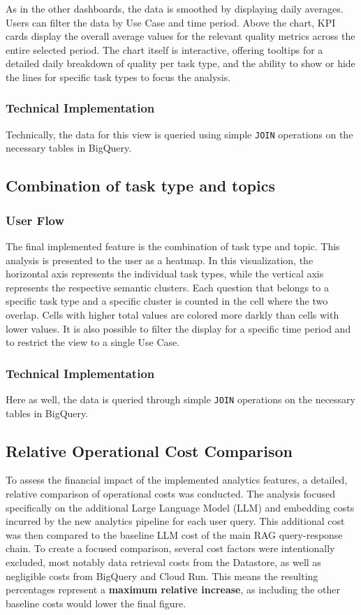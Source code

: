 \documentclass[
	english,
	ruledheaders=section,%
	class=report,%
	thesis={type=bachelor},%
	accentcolor=1b,%
	custommargins=true,%
	marginpar=false,%
	parskip=half-,%
	fontsize=11pt,%
	DIV=14,
]{tudapub}
\begin{document}
As in the other dashboards, the data is smoothed by displaying daily averages. Users can filter the data by Use Case and time period. Above the chart, KPI cards display the overall average values for the relevant quality metrics across the entire selected period. The chart itself is interactive, offering tooltips for a detailed daily breakdown of quality per task type, and the ability to show or hide the lines for specific task types to focus the analysis.

\subsubsection{Technical Implementation}
Technically, the data for this view is queried using simple \texttt{JOIN} operations on the necessary tables in BigQuery.
\subsection{Combination of task type and topics}
\subsubsection{User Flow}
The final implemented feature is the combination of task type and topic. This analysis is presented to the user as a heatmap. In this visualization, the horizontal axis represents the individual task types, while the vertical axis represents the respective semantic clusters. Each question that belongs to a specific task type and a specific cluster is counted in the cell where the two overlap. Cells with higher total values are colored more darkly than cells with lower values. It is also possible to filter the display for a specific time period and to restrict the view to a single Use Case.

\subsubsection{Technical Implementation}
Here as well, the data is queried through simple \texttt{JOIN} operations on the necessary tables in BigQuery.

\subsection{Relative Operational Cost Comparison}
To assess the financial impact of the implemented analytics features, a detailed, relative comparison of operational costs was conducted. The analysis focused specifically on the additional Large Language Model (LLM) and embedding costs incurred by the new analytics pipeline for each user query. This additional cost was then compared to the baseline LLM cost of the main RAG query-response chain. To create a focused comparison, several cost factors were intentionally excluded, most notably data retrieval costs from the Datastore, as well as negligible costs from BigQuery and Cloud Run. This means the resulting percentages represent a \textbf{maximum relative increase}, as including the other baseline costs would lower the final figure.
\end{document}
